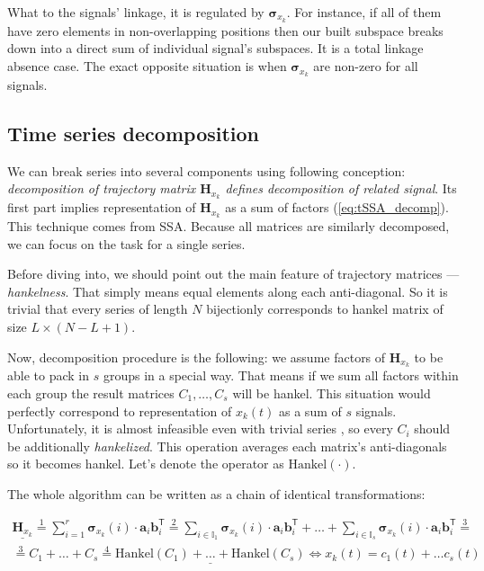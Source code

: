 \documentclass[referee, pdflatex]{sn-jnl}
\theoremstyle{definition}
\theoremstyle{plain}
\begin{document}
	What to the signals' linkage, it is regulated by $ \boldsymbol{\sigma}_{x_k} $. For instance, if all of them have zero elements in non-overlapping positions then our built subspace breaks down into a direct sum of individual signal's subspaces. It is a total linkage absence case. The exact opposite situation is when $ \boldsymbol{\sigma}_{x_k} $ are non-zero for all signals.
	
	\subsection{Time series decomposition}\label{sec:decomposition}
	
	We can break series into several components using following conception: \emph{decomposition of trajectory matrix $ \mathbf{H}_{x_k} $ defines decomposition of related signal}. Its first part implies representation of $ \mathbf{H}_{x_k} $ as a sum of factors (\ref{eq:tSSA_decomp}). This technique comes from SSA. Because all matrices are similarly decomposed, we can focus on the task for a single series.
	
	Before diving into, we should point out the main feature of trajectory matrices --- \emph{hankelness}. That simply means equal elements along each anti-diagonal. So it is trivial that every series of length $ N $ bijectionly corresponds to hankel matrix of size $ L \times (N - L + 1) $.
	
	Now, decomposition procedure is the following: we assume factors of $ \mathbf{H}_{x_k} $ to be able to pack in $ s $ groups in a special way. That means if we sum all factors within each group the result matrices $ C_1, \ldots, C_s $ will be hankel. This situation would perfectly correspond to representation of $ x_k(t) $ as a sum of $ s $ signals. Unfortunately, it is almost infeasible even with trivial series \cite{ecfb9dc578be43ae9ee8fc88b8ff9151}, so every $ C_i $ should be additionally \emph{hankelized}. This operation averages each matrix's anti-diagonals so it becomes hankel. Let's denote the operator as $ \text{Hankel}(\cdot) $. 
	
	The whole algorithm can be written as a chain of identical transformations:
	
	\begin{multline}\label{eq:decomp_method_ideal}
		\underline{\mathbf{H}_{x_k}} \overset{1}{=} \sum\limits_{i = 1}^{r} \boldsymbol{\sigma}_{x_k}(i) \cdot \mathbf{a}_i  \mathbf{b}_i^{\mathsf{T}} \overset{2}{=} \sum\limits_{i \in \mathbb{I}_1} \boldsymbol{\sigma}_{x_k}(i) \cdot \mathbf{a}_i  \mathbf{b}_i^{\mathsf{T}} + \ldots + \sum\limits_{i \in \mathbb{I}_s} \boldsymbol{\sigma}_{x_k}(i) \cdot \mathbf{a}_i  \mathbf{b}_i^{\mathsf{T}} \overset{3}{=} \\ \overset{3}{=} C_1 + \ldots + C_s \overset{4}{=} \underline{\text{Hankel}(C_1) + \ldots + \text{Hankel}(C_s)}  \Leftrightarrow x_k(t) = c_1(t) + \ldots c_s(t)
	\end{multline}
	
\end{document}
